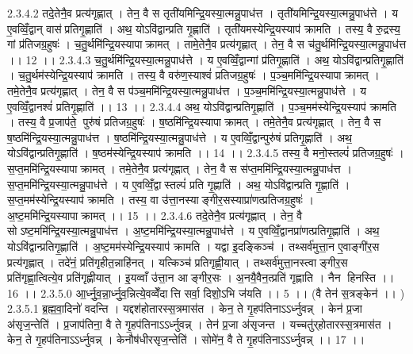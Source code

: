2.3.4.2
तदे॒तेनै॒व प्रत्य॑गृह्णात् । तेन॒ वै स तृती॑यमिन्द्रि॒यस्या॒त्मन्नु॒पाध॑त्त । तृती॑यमिन्द्रि॒यस्या॒त्मन्नु॒पाध॑त्ते । य ए॒वव्विँ॒द्वान् वास॑प्रतिगृ॒ह्णाति॑ । अथ॒ योऽवि॑द्वान्प्रति गृ॒ह्णाति॑ । तृती॑यमस्येन्द्रि॒यस्याप॑ क्रामति । तस्य॒ वै रु॒द्रस्य॒ गां प्र॑तिजग्र॒हुषः॑ । च॒तु॒र्थमि॑न्द्रि॒यस्यापाक्रामत् । तामे॒तेनै॒व प्रत्य॑गृह्णात् । तेन॒ वै स च॑तु॒र्थमि॑न्द्रि॒यस्या॒त्मन्नु॒पाध॑त्त ।। 12 ।।
2.3.4.3
च॒तु॒र्थमि॑न्द्रि॒यस्या॒त्मन्नु॒पाध॑त्ते । य ए॒वव्विँ॒द्वान्गां प्र॑तिगृ॒ह्णाति॑ । अथ॒ योऽवि॑द्वान्प्रतिगृ॒ह्णाति॑ । च॒तु॒र्थम॑स्येन्द्रि॒यस्याप॑ क्रामति । तस्य॒ वै वरु॑ण॒स्याश्वं॑ प्रतिजग्र॒हुषः॑ । प॒ञ्च॒ममि॑न्द्रि॒यस्यापाक्रामत् । तमे॒तेनै॒व प्रत्य॑गृह्णात् । तेन॒ वै स प॑ञ्च॒ममि॑न्द्रि॒यस्या॒त्मन्नु॒पाध॑त्त । प॒ञ्च॒ममि॑न्द्रि॒यस्या॒त्मन्नु॒पाध॑त्ते । य ए॒वव्विँ॒द्वानश्वं॑ प्रतिगृ॒ह्णाति॑ ।। 13 ।।
2.3.4.4
अथ॒ योऽवि॑द्वान्प्रतिगृ॒ह्णाति॑ । प॒ञ्च॒मम॑स्येन्द्रि॒यस्याप॑ क्रामति । तस्य॒ वै प्र॒जाप॑ते॒ पुरु॑षं प्रतिजग्र॒हुषः॑ । ष॒ष्ठमि॑न्द्रि॒यस्यापाक्रामत् । तमे॒तेनै॒व प्रत्य॑गृह्णात् । तेन॒ वै स ष॒ष्ठमि॑न्द्रि॒यस्या॒त्मन्नु॒पाध॑त्त । ष॒ष्ठमि॑न्द्रि॒यस्या॒त्मन्नु॒पाध॑त्ते । य ए॒वव्विँ॒द्वान्पुरु॑षं प्रतिगृ॒ह्णाति॑ । अथ॒ योऽवि॑द्वान्प्रतिगृ॒ह्णाति॑ । ष॒ष्ठम॑स्येन्द्रि॒यस्याप॑ क्रामति ।। 14 ।।
2.3.4.5
तस्य॒ वै मनो॒स्तल्पं॑ प्रतिजग्र॒हुषः॑ । स॒प्त॒ममि॑न्द्रि॒यस्यापाक्रामत् । तमे॒तेनै॒व प्रत्य॑गृह्णात् । तेन॒ वै स स॑प्त॒ममि॑न्द्रि॒यस्या॒त्मन्नु॒पाध॑त्त । स॒प्त॒ममि॑न्द्रि॒यस्या॒त्मन्नु॒पाध॑त्ते । य ए॒वव्विँ॒द्वास्तल्पं॑ प्रति गृ॒ह्णाति॑ । अथ॒ योऽवि॑द्वान्प्रति गृ॒ह्णाति॑ । स॒प्त॒मम॑स्येन्द्रि॒यस्याप॑ क्रामति । तस्य॒ वा उ॑त्ता॒नस्याङ्गीर॒सस्याप्रा॑णत्प्रतिजग्र॒हुषः॑ । अ॒ष्ट॒ममि॑न्द्रि॒यस्यापाक्रामत् ।। 15 ।।
2.3.4.6
तदे॒तेनै॒व प्रत्य॑गृह्णात् । तेन॒ वै सोऽष्ट॒ममि॑न्द्रि॒यस्या॒त्मन्नु॒पाध॑त्त । अ॒ष्ट॒ममि॑न्द्रि॒यस्या॒त्मन्नु॒पाध॑त्ते । य ए॒वव्विँ॒द्वानप्रा॑णत्प्रतिगृ॒ह्णाति॑ । अथ॒ योऽवि॑द्वान्प्रतिगृ॒ह्णाति॑ । अ॒ष्ट॒मम॑स्येन्द्रि॒यस्याप॑ क्रामति । यद्वा इ॒दङ्किञ्च॑ । तथ्सर्व॑मुत्ता॒न ए॒वाङ्गी॑र॒स प्रत्य॑गृह्णात् । तदे॑नं॒ प्रति॑गृहीत॒न्नाहि॑नत् । यत्किञ्च॑ प्रतिगृह्णी॒यात् । तथ्सर्व॑मुत्ता॒नस्त्वाङ्गीर॒स प्रति॑गृह्णा॒त्वित्ये॒व प्रति॑गृह्णीयात् । इ॒यव्वाँ उ॑त्ता॒न आङ्गीर॒सः । अ॒नयै॒वैन॒त्प्रति॑ गृह्णाति । नैन॑ हिनस्ति ।। 16 ।।
2.3.5.0
आ॒र्ध्नु॒व॒न्ना॒र्ध्नु॒व॒न्नित्ये॒वव्वेँदात्ति सर्वा॒ दिशो॒ऽभि ज॑यति ।। 5 ।। (वै तेन॑ स॒त्रङ्केन॑ ।। )
2.3.5.1
ब्र॒ह्म॒वा॒दिनो॑ वदन्ति । यद्दश॑होतारस्स॒त्रमास॑त । केन॒ ते गृ॒हप॑तिनाऽऽर्ध्नुवन्न् । केन॑ प्र॒जा अ॑सृज॒न्तेति॑ । प्र॒जाप॑तिना॒ वै ते गृ॒हप॑तिनाऽऽर्ध्नुवन्न् । तेन॑ प्र॒जा अ॑सृजन्त । यच्चतु॑र्‌होतारस्स॒त्रमास॑त । केन॒ ते गृ॒हप॑तिनाऽऽर्ध्नुवन्न् । केनौष॑धीरसृज॒न्तेति॑ । सोमे॑न॒ वै ते गृ॒हप॑तिनाऽऽर्ध्नुवन्न् ।। 17 ।।
